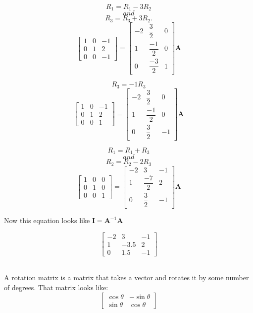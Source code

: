 \begin{enumerate}
{	$$R_1 = R_1 - 3R_2$$ $$and$$ $$R_3 = R_3 + 3R_2.$$
	$$\begin{bmatrix} 
	1 & 0 & -1 \\
	0 & 1 & 2 \\
	0 & 0 & -1 \end{bmatrix} = 
	\begin{bmatrix} 
	-2 & \dfrac{3}{2} & 0 \\
	1 & \dfrac{-1}{2} & 0 \\ 
	0 & \dfrac{-3}{2} & 1 \end{bmatrix}
	\mathbf{A}$$

	$$R_3 = -1R_3$$
	$$\begin{bmatrix} 
	1 & 0 & -1 \\
	0 & 1 & 2 \\
	0 & 0 & 1 \end{bmatrix} = 
	\begin{bmatrix} 
	-2 & \dfrac{3}{2} & 0 \\
	1 & \dfrac{-1}{2} & 0 \\ 
	0 & \dfrac{3}{2} & -1 \end{bmatrix}
	\mathbf{A}$$

	$$R_1 = R_1 + R_3$$ $$and$$ $$R_2 = R_2 - 2R_3$$
	$$\begin{bmatrix} 
	1 & 0 & 0 \\
	0 & 1 & 0 \\
	0 & 0 & 1 \end{bmatrix} = 
	\begin{bmatrix} 
	-2 & 3 & -1 \\
	1 & \dfrac{-7}{2} & 2 \\ 
	0 & \dfrac{3}{2} & -1 \end{bmatrix}
	\mathbf{A}$$

Now this equation looks like $\mathbf{I} = \mathbf{A}^{-1}\mathbf{A}$


	$$\begin{bmatrix}	
	-2 & 3 & -1 \\
	1 & -3.5 & 2 \\
	0 & 1.5 & -1 \end{bmatrix}$$ \\
} 


A rotation matrix is a matrix that takes a vector and rotates it by some number of degrees. That matrix looks like: \\
  $$\begin{bmatrix}
  \cos{\theta} & -\sin{\theta} \\
  \sin{\theta} & \cos{\theta} \end{bmatrix}$$ \\


\end{enumerate}
